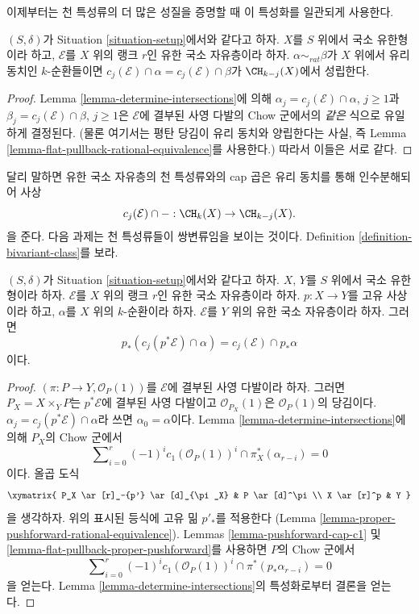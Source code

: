 \noindent
이제부터는 천 특성류의 더 많은 성질을 증명할 때 이 특성화를 일관되게
사용한다.

\begin{lemma}
\label{lemma-cap-chern-class-factors-rational-equivalence}
$(S, \delta)$가 Situation \ref{situation-setup}에서와 같다고 하자.
$X$를 $S$ 위에서 국소 유한형이라 하고, $\mathcal{E}$를 $X$ 위의
랭크 $r$인 유한 국소 자유층이라 하자. $\alpha \sim_{rat} \beta$가
$X$ 위에서 유리 동치인 $k$-순환들이면
$c_j(\mathcal{E}) \cap \alpha = c_j(\mathcal{E}) \cap \beta$가
$\CH_{k - j}(X)$에서 성립한다.
\end{lemma}

\begin{proof}
Lemma \ref{lemma-determine-intersections}에 의해
$\alpha_j = c_j(\mathcal{E}) \cap \alpha$, $j \geq 1$과
$\beta_j = c_j(\mathcal{E}) \cap \beta$, $j \geq 1$은
$\mathcal{E}$에 결부된 사영 다발의 Chow 군에서의 {\it 같은} 식으로
유일하게 결정된다. (물론 여기서는 평탄 당김이 유리 동치와 양립한다는
사실, 즉 Lemma \ref{lemma-flat-pullback-rational-equivalence}를
사용한다.) 따라서 이들은 서로 같다.
\end{proof}

\noindent
달리 말하면 유한 국소 자유층의 천 특성류와의 cap 곱은 유리 동치를
통해 인수분해되어 사상
$$
c_j(\mathcal{E}) \cap - : \CH_k(X) \to \CH_{k - j}(X).
$$
을 준다. 다음 과제는 천 특성류들이 쌍변류임을 보이는 것이다. Definition
\ref{definition-bivariant-class}를 보라.

\begin{lemma}
\label{lemma-pushforward-cap-cj}
$(S, \delta)$가 Situation \ref{situation-setup}에서와 같다고 하자.
$X$, $Y$를 $S$ 위에서 국소 유한형이라 하자. $\mathcal{E}$를 $X$ 위의
랭크 $r$인 유한 국소 자유층이라 하자. $p : X \to Y$를 고유 사상이라
하고, $\alpha$를 $X$ 위의 $k$-순환이라 하자. $\mathcal{E}$를 $Y$ 위의
유한 국소 자유층이라 하자. 그러면
$$
p_*(c_j(p^*\mathcal{E}) \cap \alpha) = c_j(\mathcal{E}) \cap p_*\alpha
$$
이다.
\end{lemma}

\begin{proof}
$(\pi : P \to Y, \mathcal{O}_P(1))$를 $\mathcal{E}$에 결부된 사영
다발이라 하자. 그러면 $P_X = X \times_Y P$는 $p^*\mathcal{E}$에
결부된 사영 다발이고 $\mathcal{O}_{P_X}(1)$은
$\mathcal{O}_P(1)$의 당김이다.
$\alpha_j = c_j(p^*\mathcal{E}) \cap \alpha$라 쓰면
$\alpha_0 = \alpha$이다. Lemma \ref{lemma-determine-intersections}에
의해 $P_X$의 Chow 군에서
$$
\sum\nolimits_{i = 0}^r
(-1)^i c_1(\mathcal{O}_P(1))^i \cap
\pi_X^*(\alpha_{r - i}) = 0
$$
이다. 올곱 도식
$$
\xymatrix{
P_X \ar[r]_-{p'} \ar[d]_{\pi_X} & P \ar[d]^\pi \\
X \ar[r]^p & Y
}
$$
을 생각하자. 위의 표시된 등식에 고유 밂 $p'_*$를 적용한다
(Lemma \ref{lemma-proper-pushforward-rational-equivalence}).
Lemmas \ref{lemma-pushforward-cap-c1} 및
\ref{lemma-flat-pullback-proper-pushforward}를 사용하면 $P$의 Chow
군에서
$$
\sum\nolimits_{i = 0}^r
(-1)^i c_1(\mathcal{O}_P(1))^i \cap
\pi^*(p_*\alpha_{r - i}) = 0
$$
을 얻는다. Lemma \ref{lemma-determine-intersections}의 특성화로부터
결론을 얻는다.
\end{proof}

